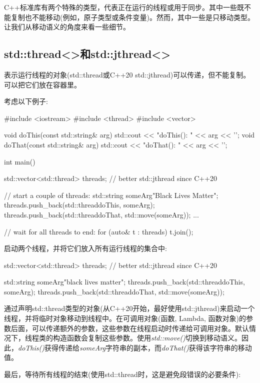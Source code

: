 C++标准库有两个特殊的类型，代表正在运行的线程或用于同步。其中一些既不能复制也不能移动(例如，原子类型或条件变量)。然而，其中一些是只移动类型。让我们从移动语义的角度来看一些细节。

\subsection{std::thread<>和std::jthread<>}

表示运行线程的对象(std::thread或C++20 std::jthread)可以传递，但不能复制。可以把它们放在容器里。

考虑以下例子:

\begin{cppcode}
#include <iostream>
#include <thread>
#include <vector>

void doThis(const std::string& arg) {
	std::cout << "doThis(): " << arg << '\n';
}
void doThat(const std::string& arg) {
	std::cout << "doThat(): " << arg << '\n';
}

int main()
{
	std::vector<std::thread> threads; // better std::jthread since C++20
	
	// start a couple of threads:
	std::string someArg{"Black Lives Matter"};
	threads.push_back(std::thread{doThis, someArg});
	threads.push_back(std::thread{doThat, std::move(someArg)});
	...
	
	// wait for all threads to end:
	for (auto& t : threads) {
		t.join();
	}
}
\end{cppcode}

启动两个线程，并将它们放入所有运行线程的集合中:

\begin{cppcode}
std::vector<std::thread> threads; // better std::jthread since C++20

std::string someArg{"black lives matter"};
threads.push_back(std::thread{doThis, someArg});
threads.push_back(std::thread{doThat, std::move(someArg)});
\end{cppcode}

通过声明std::thread类型的对象(从C++20开始，最好使用std::jthread)来启动一个线程，并将临时对象移动到线程中。在可调用对象(函数, Lambda, 函数对象)的参数后面，可以传递额外的参数，这些参数在线程启动时传递给可调用对象。默认情况下，线程类的构造函数会复制这些参数。使用\textit{std::move()}切换到移动语义。因此，\textit{doThis()}获得传递给\textit{someArg}字符串的副本，而\textit{doThat()}获得该字符串的移动值。

最后，等待所有线程的结束(使用std::thread时，这是避免段错误的必要条件):

